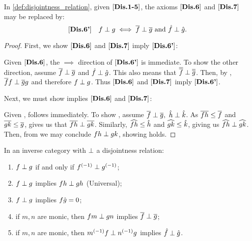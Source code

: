 \begin{lemma}\label{lem:disjointness_equivalent_axioms}
  In \ref{def:disjointness_relation}, given $[\text{\bfseries {Dis}.{1-5}}]$, the axioms $[\text{\bfseries {Dis}.{6}}]$ and
  $[\text{\bfseries {Dis}.{7}}]$ may be replaced by:
  \[
    [\text{\bfseries {Dis}.{6'}}]\quad f\perp g \iff \overline{f} \perp \overline{g}
      \text{ and }\hat{f}\perp\hat{g}.
  \]
\end{lemma}
\begin{proof}
  First, we show $[\text{\bfseries {Dis}.{6}}]$ and $[\text{\bfseries {Dis}.{7}}]$ imply $[\text{\bfseries {Dis}.{6'}}]$:

  Given $[\text{\bfseries {Dis}.{6}}]$, the $\implies$ direction of $[\text{\bfseries {Dis}.{6'}}]$ is
  immediate. To show the other direction, assume $\overline{f} \perp \overline{g}$ and
  $\hat{f}\perp\hat{g}$. This also means that $\overline{\overline{f}} \perp \overline{\overline{g}}$. Then, by
  , $\overline{f} f \perp \overline{g}g$ and therefore $f \perp g$. Thus $[\text{\bfseries {Dis}.{6}}]$
  and $[\text{\bfseries {Dis}.{7}}]$ imply $[\text{\bfseries {Dis}.{6'}}]$.

  Next, we must show  implies  $[\text{\bfseries {Dis}.{6}}]$ and $[\text{\bfseries {Dis}.{7}}]$:

  Given ,  follows immediately. To show
  , assume $\overline{f}\perp \overline{g},\ \hat{h}\perp \hat{k}$. As
  $\overline{f h} \le \overline{f}$ and $\overline{g k}\le\overline{g}$,  gives us that
  $\overline{f h} \perp \overline{g k}$. Similarly, $\widehat{f h} \le \hat{h}$ and $\widehat{g k} \le \hat{k}$,
  giving us $\widehat{f h}\perp \widehat{g k}$. Then, from  we may conclude
  $f h \perp g k$, showing  holds.
\end{proof}
\begin{lemma}\label{lem:disjointness_various}
  In an inverse category \X with $\perp$ a disjointness relation:
  \begin{enumerate}[{(}i{)}]
    \item $f \perp g$ if and only if ${f}^{(-1)}\perp {g}^{(-1)}$; \label{lemitem:djv_inverses}
    \item $f \perp g$ implies $f h \perp g h$ (Universal);\label{lemitem:djv_universal}
    \item $f \perp g$ implies $f\hat{g} = 0$; \label{lemitem:djv_disjoint_composition_is_0}
    \item if $m,n$ are monic, then $f m \perp g n$ implies $\overline{f} \perp \overline{g}$;
      \label{lemitem:djv_monic_implies}
    \item if $m,n$ are monic, then ${m}^{(-1)} f \perp {n}^{(-1)}g$ implies $\hat{f} \perp \hat{g}$.
      \label{lemitem:djv_inv_monic_implies}
  \end{enumerate}
\end{lemma}
